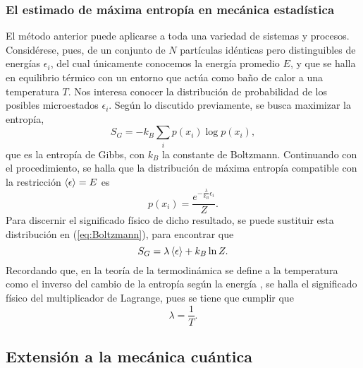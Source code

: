 \subsubsection{El estimado de máxima entropía en mecánica estadística}

El método anterior puede aplicarse a toda una variedad de sistemas y procesos. Considérese, pues, de un conjunto de $N$ partículas idénticas pero distinguibles de energías $\epsilon_{i}$, del cual únicamente conocemos la energía promedio $E$, y que se halla en equilibrio térmico con un entorno que actúa como baño de calor a una temperatura $T$. Nos interesa conocer la distribución de probabilidad de los posibles microestados $\epsilon_{i}$. Según lo discutido previamente, se busca maximizar la entropía,
\begin{equation}\label{eq:GibbsEntropy}
    S_{G}=-k_{B}\sum_{i}p(x_{i})\log{p(x_{i})},
\end{equation}
que es la entropía de Gibbs, con $k_{B}$ la constante de Boltzmann. Continuando con el procedimiento, se halla que la distribución de máxima entropía compatible con la restricción $\expval{\epsilon}=E$ es
\begin{equation}\label{eq:Boltzmann}
    p(x_{i})=\frac{e^{-\frac{\lambda}{k_{B}}\epsilon_{i}}}{Z}.
\end{equation}
Para discernir el significado físico de dicho resultado, se puede sustituir esta distribución en (\ref{eq:Boltzmann}), para encontrar que
\begin{equation}
    S_{G}=\lambda\expval{\epsilon}+k_{B}\ln{Z}.
\end{equation}
Recordando que, en la teoría de la termodinámica  se define a la temperatura como el inverso del cambio de la entropía según la energía \cite{Greiner}, se halla el significado físico del multiplicador de Lagrange, pues se tiene que cumplir que
\begin{equation*}
    \lambda=\frac{1}{T}.
\end{equation*}

\subsection{Extensión a la mecánica cuántica}


